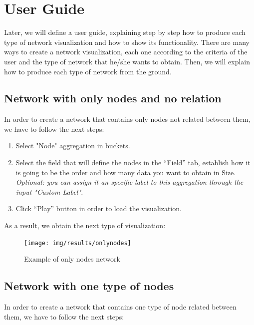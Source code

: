 \documentclass[a4paper, 12pt]{book}
\begin{document}
\section{User Guide}

Later, we will define a user guide, explaining step by step how to produce each type of network visualization and how to show its functionality. There are many ways to create a network visualization, each one according to the criteria of the user and the type of network that he/she wants to obtain. Then, we will explain how to produce each type of network from the ground.

\subsection{Network with only nodes and no relation}

In order to create a network that contains only nodes not related between them, we have to follow the next steps:

\begin{enumerate}
\item Select "Node" aggregation in buckets.
\item Select the field that will define the nodes in the “Field” tab, establish how it is going to be the order and how many data you want to obtain in Size. \textit{Optional: you can assign it an specific label to this aggregation through the input "Custom Label".}
\item Click “Play” button in order to load the visualization.
\end{enumerate}

As a result, we obtain the next type of visualization:

\begin{figure}[H]
  \centering
  \texttt{[image: img/results/onlynodes]}
  \caption{Example of only nodes network}
  \label{fig:onlynodes}
\end{figure}


\subsection{Network with one type of nodes}

In order to create a network that contains one type of node related between them, we have to follow the next steps:
\end{document}
